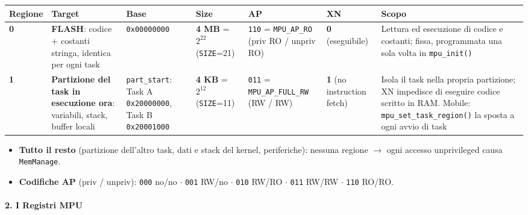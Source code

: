 \begin{table}[htbp]
\centering
\begin{tabular}{|l|p{3.5cm}|l|l|l|l|p{4.5cm}|}
\hline
\textbf{Regione} & \textbf{Target} & \textbf{Base} & \textbf{Size} & \textbf{AP} & \textbf{XN} & \textbf{Scopo} \\
\hline
\textbf{0} & \textbf{FLASH}: codice + costanti stringa, identica per ogni task & \texttt{0x00000000} & \textbf{4 MB} = $2^{22}$ (\texttt{SIZE}=21) & \texttt{110} = \texttt{MPU\_AP\_RO} (priv RO / unpriv RO) & \textbf{0} (eseguibile) & Lettura ed esecuzione di codice e costanti; fissa, programmata una sola volta in \texttt{mpu\_init()} \\
\hline
\textbf{1} & \textbf{Partizione del task in esecuzione ora}: variabili, stack, buffer locali & \texttt{part\_start}: Task A \texttt{0x20000000}, Task B \texttt{0x20001000} & \textbf{4 KB} = $2^{12}$ (\texttt{SIZE}=11) & \texttt{011} = \texttt{MPU\_AP\_FULL\_RW} (RW / RW) & \textbf{1} (no instruction fetch) & Isola il task nella propria partizione; XN impedisce di eseguire codice scritto in RAM. Mobile: \texttt{mpu\_set\_task\_region()} la sposta a ogni avvio di task \\
\hline
\end{tabular}
\end{table}

\begin{itemize}
    \item \textbf{Tutto il resto} (partizione dell'altro task, dati e stack del kernel, periferiche): nessuna regione $\rightarrow$ ogni accesso unprivileged causa \texttt{MemManage}.
    \item \textbf{Codifiche AP} (priv / unpriv): \texttt{000} no/no $\cdot$ \texttt{001} RW/no $\cdot$ \texttt{010} RW/RO $\cdot$ \texttt{011} RW/RW $\cdot$ \texttt{110} RO/RO.
\end{itemize}

\paragraph*{2. I Registri MPU}

